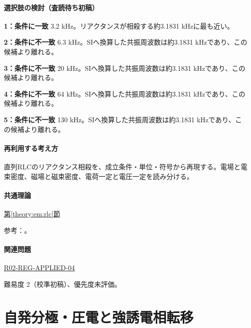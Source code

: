 \paragraph{選択肢の検討（査読待ち初稿）}\mbox{}\par

\noindent\textbf{1：条件に一致} 3.2 kHz。リアクタンスが相殺する約3.1831 kHzに最も近い。\par

\noindent\textbf{2：条件に不一致} 6.3 kHz。SIへ換算した共振周波数は約3.1831 kHzであり、この候補より離れる。\par

\noindent\textbf{3：条件に不一致} 20 kHz。SIへ換算した共振周波数は約3.1831 kHzであり、この候補より離れる。\par

\noindent\textbf{4：条件に不一致} 64 kHz。SIへ換算した共振周波数は約3.1831 kHzであり、この候補より離れる。\par

\noindent\textbf{5：条件に不一致} 130 kHz。SIへ換算した共振周波数は約3.1831 kHzであり、この候補より離れる。\par

\paragraph{再利用する考え方} 直列RLCのリアクタンス相殺を、成立条件・単位・符号から再現する。電場と電束密度、磁場と磁束密度、電荷一定と電圧一定を読み分ける。

\paragraph{共通理論} \hyperref[theory:em:rlc]{第\ref*{theory:em:rlc}節}

\par 参考：\cite{mit_em12}。

\paragraph{関連問題} \hyperref[q:r02-reg-applied-04]{R02-REG-APPLIED-04}

\par 難易度 2（校準初稿）、優先度未評価。

\section{自発分極・圧電と強誘電相転移}

